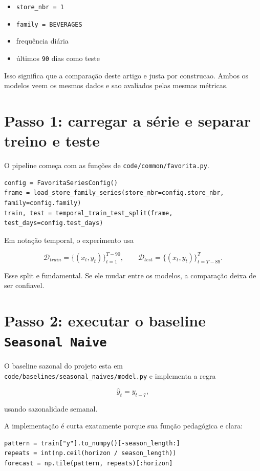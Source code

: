 \documentclass[12pt]{article}
\providecommand{\tightlist}{%
              \setlength{\itemsep}{0pt}\setlength{\parskip}{0pt}}
\begin{document}
\begin{itemize}
\tightlist
\item
  \texttt{store\_nbr\ =\ 1}
\item
  \texttt{family\ =\ BEVERAGES}
\item
  frequência diária
\item
  últimos \texttt{90} dias como teste
\end{itemize}

Isso significa que a comparação deste artigo e justa por construcao. Ambos os modelos veem os mesmos dados e sao avaliados pelas mesmas métricas.

\section{Passo 1: carregar a série e separar treino e teste}\label{3-passo-1-carregar-a-suxe9rie-e-separar-treino-e-teste}

O pipeline começa com as funções de \texttt{code/common/favorita.py}.

\begin{verbatim}
config = FavoritaSeriesConfig()
frame = load_store_family_series(store_nbr=config.store_nbr, family=config.family)
train, test = temporal_train_test_split(frame, test_days=config.test_days)
\end{verbatim}

Em notação temporal, o experimento usa

\[
\mathcal{D}_{train} = \{(x_t, y_t)\}_{t=1}^{T-90},
\qquad
\mathcal{D}_{test} = \{(x_t, y_t)\}_{t=T-89}^T.
\]

Esse split e fundamental. Se ele mudar entre os modelos, a comparação deixa de ser confiavel.

\section{\texorpdfstring{Passo 2: executar o baseline \texttt{Seasonal\ Naive}}{Passo 2: executar o baseline Seasonal Naive}}\label{4-passo-2-executar-o-baseline-seasonal-naive}

O baseline sazonal do projeto esta em \texttt{code/baselines/seasonal\_naives/model.py} e implementa a regra

\[
\hat{y}_t = y_{t-7},
\]

usando sazonalidade semanal.

A implementação é curta exatamente porque sua função pedagógica e clara:

\begin{verbatim}
pattern = train["y"].to_numpy()[-season_length:]
repeats = int(np.ceil(horizon / season_length))
forecast = np.tile(pattern, repeats)[:horizon]
\end{verbatim}
\end{document}
